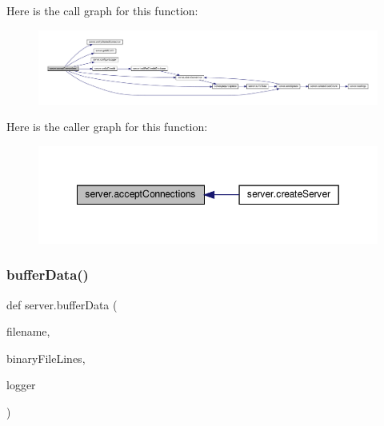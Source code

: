 Here is the call graph for this function\+:
\nopagebreak
\begin{figure}[H]
\begin{center}
\leavevmode
\includegraphics[width=350pt]{namespaceserver_ac1ec62c626a3425033381ef5718ce12b_cgraph}
\end{center}
\end{figure}
Here is the caller graph for this function\+:
\nopagebreak
\begin{figure}[H]
\begin{center}
\leavevmode
\includegraphics[width=349pt]{namespaceserver_ac1ec62c626a3425033381ef5718ce12b_icgraph}
\end{center}
\end{figure}
\mbox{\label{namespaceserver_a6098d5cffff301a01e793c84215c4512}} 
\subsubsection{\texorpdfstring{buffer\+Data()}{bufferData()}}
{\footnotesize\ttfamily def server.\+buffer\+Data (\begin{DoxyParamCaption}\item[{}]{filename,  }\item[{}]{binary\+File\+Lines,  }\item[{}]{logger }\end{DoxyParamCaption})}


